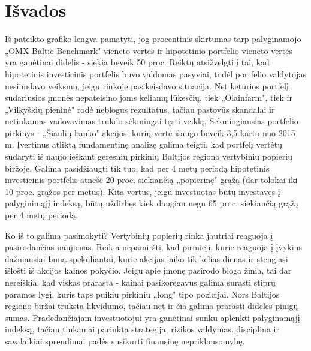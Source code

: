 \documentclass[12pt]{article}
\begin{document}
\section{Išvados}

Iš pateikto grafiko lengva pamatyti, jog procentinis skirtumas tarp palyginamojo „OMX Baltic Benchmark" vieneto vertės ir hipotetinio portfelio vieneto vertės yra ganėtinai didelis - siekia beveik 50 proc. Reiktų atsižvelgti į tai, kad hipotetinis investicinis portfelis buvo valdomas pasyviai, todėl portfelio valdytojas nesiimdavo veiksmų, jeigu rinkoje pasikeisdavo situacija. Net keturios portfelį sudariusios įmonės nepateisino joms keliamų lūkesčių, tiek  „Olainfarm", tiek ir „Vilkyškių pieninė" rodė neblogus rezultatus, tačiau pastovūs skandalai ir netinkamas vadovavimas trukdo sėkmingai tęsti veiklą. Sėkmingiausias portfelio pirkinys -  „Šiaulių banko" akcijos, kurių vertė išaugo beveik 3,5 karto nuo 2015 m.
Įvertinus atliktą fundamentinę analizę galima teigti, kad portfelį vertėtų sudaryti iš naujo ieškant geresnių pirkinių Baltijos regiono vertybinių popierių biržoje. Galima pasidžiaugti tik tuo, kad per 4 metų periodą hipotetinis investicinis portfelis atnešė 20 proc. siekiančią  „popierinę" grąžą (dar tolokai iki 10 proc. grąžos per metus). Kita vertus, jeigu investuotas būtų investavęs į palyginimąjį indeksą, būtų uždirbęs kiek daugiau negu 65 proc. siekiančią grąžą per 4 metų periodą.

Ko iš to galima pasimokyti? Vertybinių popierių rinka jautriai reaguoja į pasirodančias naujienas. Reikia nepamiršti, kad pirmieji, kurie reaguoja į įvykius dažniausiai būna spekuliantai, kurie akcijas laiko tik kelias dienas ir stengiasi išlošti iš akcijos kainos pokyčio. Jeigu apie įmonę pasirodo bloga žinia, tai dar nereiškia, kad viskas prarasta - kainai pasikoregavus galima surasti stiprų paramos lygį, kuris taps puikiu pirkiniu „long" tipo pozicijai. Nors Baltijos regiono biržai trūksta likvidumo, tačiau net ir čia galima prarasti dideles pinigų sumas. Pradedančiajam investuotojui yra ganėtinai sunku aplenkti palyginamąjį indeksą, tačiau tinkamai parinkta strategija, rizikos valdymas, disciplina ir savalaikiai sprendimai padės susikurti finansinę nepriklausomybę.
\end{document}
